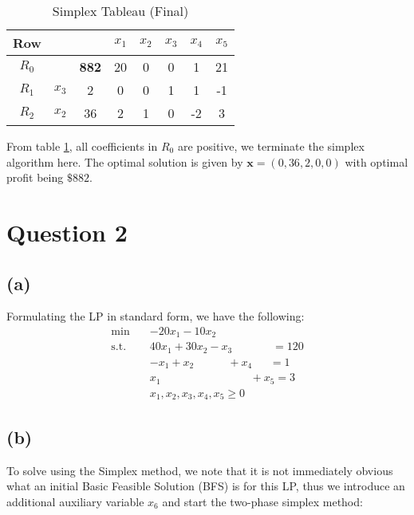 \documentclass[12pt]{article}
\begin{document}
\begin{table}[H]
    \centering
    \begin{tabular}{c | c c | c c c c c}
        Row & & & $x_{1}$ & $x_{2}$ & $x_{3}$ & $x_{4}$ & $x_{5}$ \\ \hline 
        $R_{0}$ & & \textbf{882} & 20 & 0 & 0 & 1 & 21 \\ \hline 
        $R_{1}$ & $x_{3}$ & 2 & 0 & 0 & 1 & 1 & -1 \\ 
        $R_{2}$ & $x_{2}$ & 36 & 2 & 1 & 0 & -2 & 3 \\ 
    \end{tabular}
    \caption{Simplex Tableau (Final)}
    \label{tab: 1-tableau3}
\end{table} 

\noindent From table \ref{tab: 1-tableau3}, all coefficients in $R_{0}$ are positive, we terminate the simplex algorithm here. The optimal solution is given by $ \mathbf{x} = (0, 36, 2, 0, 0)$ with optimal profit being $\$ 882$. 

\newpage 

\section*{Question 2}

\subsection*{(a)}
Formulating the LP in standard form, we have the following: \begin{align*}
    \min \quad & -20 x_{1} - 10 x_{2} \\ 
    \text{s.t.} \quad & 40 x_{1} + 30 x_{2} -x_{3} \quad \quad \quad \; \; = 120 \\ 
    & - x_{1} + x_{2} \quad \quad \quad + x_{4} \quad \; \; = 1 \\ 
    & x_{1} \quad \quad \quad \quad \quad \quad \quad \quad + x_{5} = 3 \\ 
    & x_{1}, x_{2}, x_{3}, x_{4}, x_{5} \geq 0
\end{align*}

\subsection*{(b)}

To solve using the Simplex method, we note that it is not immediately obvious what an initial Basic Feasible Solution (BFS) is for this LP, thus we introduce an additional auxiliary variable $x_{6}$ and start the two-phase simplex method: 
\end{document}
